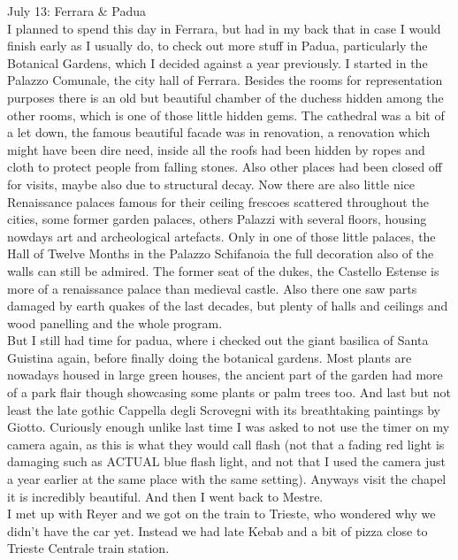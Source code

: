 July 13: Ferrara \& Padua\\
I planned to spend this day in Ferrara, but had in my back that in case I would finish early as I usually do, to check out more stuff in Padua, particularly the Botanical Gardens, which I decided against a year previously. I started in the Palazzo Comunale, the city hall of Ferrara. Besides the rooms for representation purposes there is an old but beautiful chamber of the duchess hidden among the other rooms, which is one of those little hidden gems. The cathedral was a bit of a let down, the famous beautiful facade was in renovation, a renovation which might have been dire need, inside all the roofs had been hidden by ropes and cloth to protect people from falling stones. Also other places had been closed off for visits, maybe also due to structural decay. Now there are also little nice Renaissance palaces famous for their ceiling frescoes scattered throughout the cities, some former garden palaces, others Palazzi with several floors, housing nowdays art and archeological artefacts. Only in one of those little palaces, the Hall of Twelve Months in the Palazzo Schifanoia the full decoration also of the walls can still be admired. The former seat of the dukes, the Castello Estense is more of a renaissance palace than medieval castle. Also there one saw parts damaged by earth quakes of the last decades, but plenty of halls and ceilings and wood panelling and the whole program.\\
But I still had time for padua, where i checked out the giant basilica of Santa Guistina again, before finally doing the botanical gardens. Most plants are nowadays housed in large green houses, the ancient part of the garden had more of a park flair though showcasing some plants or palm trees too. And last but not least the late gothic Cappella degli Scrovegni with its breathtaking paintings by Giotto. Curiously enough unlike last time I was asked to not use the timer on my camera again, as this is what they would call flash (not that a fading red light is damaging such as ACTUAL blue flash light, and not that I used the camera just a year earlier at the same place with the same setting). Anyways visit the chapel it is incredibly beautiful. And then I went back to Mestre.\\
I met up with Reyer and we got on the train to Trieste, who wondered why we didn't have the car yet. Instead we had late Kebab and a bit of pizza close to Trieste Centrale train station.\\

